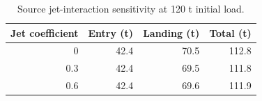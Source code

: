 \begin{table}[htbp]
\caption{Source jet-interaction sensitivity at 120 t initial load.}
\label{tab:src12}
\small
\setlength{\tabcolsep}{3.5pt}
\begin{tabularx}{\linewidth}{@{}rrrr@{}}
\toprule
Jet coefficient & Entry (t) & Landing (t) & Total (t) \\
\midrule
0 & 42.4 & 70.5 & 112.8 \\
0.3 & 42.4 & 69.5 & 111.8 \\
0.6 & 42.4 & 69.6 & 111.9 \\
\bottomrule
\end{tabularx}
\par{}
\end{table}
